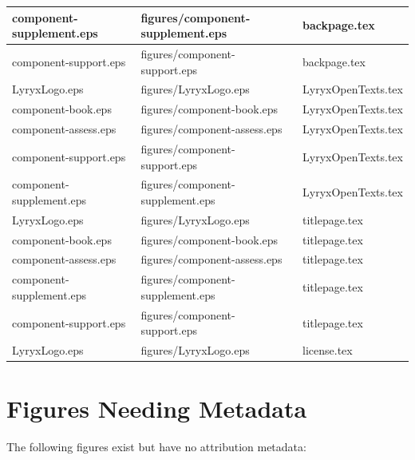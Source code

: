 \documentclass[11pt]{article}
\begin{document}
\begin{longtable}{|p{4cm}|p{4cm}|p{5cm}|}
component-supplement.eps & figures/component-supplement.eps & backpage.tex \\
\hline

component-support.eps & figures/component-support.eps & backpage.tex \\
\hline

LyryxLogo.eps & figures/LyryxLogo.eps & LyryxOpenTexts.tex \\
\hline

component-book.eps & figures/component-book.eps & LyryxOpenTexts.tex \\
\hline

component-assess.eps & figures/component-assess.eps & LyryxOpenTexts.tex \\
\hline

component-support.eps & figures/component-support.eps & LyryxOpenTexts.tex \\
\hline

component-supplement.eps & figures/component-supplement.eps & LyryxOpenTexts.tex \\
\hline

LyryxLogo.eps & figures/LyryxLogo.eps & titlepage.tex \\
\hline

component-book.eps & figures/component-book.eps & titlepage.tex \\
\hline

component-assess.eps & figures/component-assess.eps & titlepage.tex \\
\hline

component-supplement.eps & figures/component-supplement.eps & titlepage.tex \\
\hline

component-support.eps & figures/component-support.eps & titlepage.tex \\
\hline

LyryxLogo.eps & figures/LyryxLogo.eps & license.tex \\
\hline

\end{longtable}



\section{Figures Needing Metadata}
The following figures exist but have no attribution metadata:
\end{document}
